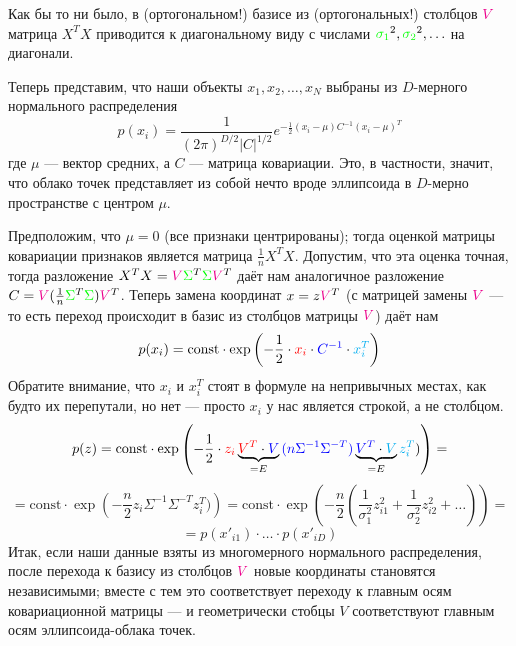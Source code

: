 \documentclass{amsart}
\theoremstyle{definition}
\theoremstyle{remark}
\numberwithin{equation}{section}
\begin{document}
\medskip

Как бы то ни было, в (ортогональном!) базисе из (ортогональных!) столбцов $\textcolor{magenta}{V}$ матрица $X^TX$ приводится к диагональному виду с числами $\textcolor{green}{\sigma_1}^2,\textcolor{green}{\sigma_2}^2,\ldots$ на диагонали.

Теперь представим, что наши объекты $x_1,x_2,\ldots,x_N$ выбраны из $D$-мерного нормального распределения
$$p(x_i) = \frac{1}{(2\pi)^{D/2}|C|^{1/2}}e^{-\frac12(x_i - \mu)C^{-1}(x_i - \mu)^T}$$
где $\mu$ --- вектор средних, а $C$ --- матрица ковариации. Это, в частности, значит, что облако точек представляет из собой нечто вроде эллипсоида в $D$-мерно пространстве с центром $\mu$.

Предположим, что $\mu = 0$ (все признаки центрированы); тогда оценкой матрицы ковариации признаков является матрица $\frac1n X^TX$. Допустим, что эта оценка точная, тогда разложение $X^TX = \textcolor{magenta}{V}\textcolor{green}{\Sigma}^T\textcolor{green}{\Sigma} \textcolor{magenta}{V}^T$ даёт нам аналогичное разложение $C = \textcolor{magenta}{V}(\frac1n\textcolor{green}{\Sigma}^T\textcolor{green}{\Sigma}) \textcolor{magenta}{V}^T$. Теперь замена координат $x = z\textcolor{magenta}{V}^T$ (с матрицей замены $\textcolor{magenta}{V}$ --- то есть переход происходит в базис из столбцов матрицы $\textcolor{magenta}{V}$) даёт нам
$$p(x_i) = \mathrm{const}\cdot \exp\left(-\frac12\cdot\textcolor{red}{x_i}\cdot \textcolor{blue}{C^{-1}}\cdot \textcolor{cyan}{x_i^T}\right)$$
Обратите внимание, что $x_i$ и $x_i^T$ стоят в формуле на непривычных местах, как будто их перепутали, но нет --- просто $x_i$ у нас является строкой, а не столбцом.
$$p(z) = \mathrm{const}\cdot \exp\left(-\frac12\cdot\textcolor{red}{z_i}\underbrace{\textcolor{red}{V^T}\cdot \textcolor{blue}{V}}_{=E}\textcolor{blue}{(n\Sigma^{-1}\Sigma^{-T})}\underbrace{\textcolor{blue}{V^T}\cdot \textcolor{cyan}{V}}_{=E}\textcolor{cyan}{z_i^T})\right)=$$
$$= \mathrm{const}\cdot \exp\left(-\frac{n}2z_i\Sigma^{-1}\Sigma^{-T}z_i^T)\right)=\mathrm{const}\cdot \exp\left(-\frac{n}2\left(\frac1{\sigma_1^2}z_{i1}^2 + \frac1{\sigma_2^2}z_{i2}^2 + \ldots\right)\right)=$$
$$=p(x'_{i1})\cdot\ldots\cdot p(x'_{iD})$$
Итак, если наши данные взяты из многомерного нормального распределения, после перехода к базису из столбцов $\textcolor{magenta}{V}$ новые координаты становятся независимыми; вместе с тем это соответствует переходу к главным осям ковариационной матрицы --- и геометрически стобцы $V$ соответствуют главным осям эллипсоида-облака точек.
\end{document}
